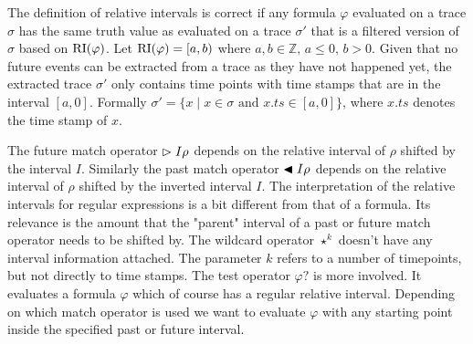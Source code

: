 The definition of relative intervals is correct if any formula $\varphi$ evaluated on a trace $\sigma$ has the same truth value as evaluated on a trace $\sigma'$ that is a filtered version of $\sigma$ based on $\operatorname{RI}(\varphi)$.
Let $\operatorname{RI}(\varphi) = [a,b)$ where $a,b \in \mathbb{Z}, \, a \leq 0, \, b > 0$.
Given that no future events can be extracted from a trace as they have not happened yet, the extracted trace $\sigma'$ only contains time points with time stamps that are in the interval $[a,0]$.
Formally $\sigma' = \{x \mid x \in \sigma \text{ and } x.ts \in [a,0]\}$, where $x.ts$ denotes the time stamp of $x$.

The future match operator $\vartriangleright{I} \rho$ depends on the relative interval of $\rho$ shifted by the interval $I$.
Similarly the past match operator $\blacktriangleleft{I} \rho$ depends on the relative interval of $\rho$ shifted by the inverted interval $I$.
The interpretation of the relative intervals for regular expressions is a bit different from that of a formula.
Its relevance is the amount that the "parent" interval of a past or future match operator needs to be shifted by.
The wildcard operator $\star^k$ doesn't have any interval information attached.
The parameter $k$ refers to a number of timepoints, but not directly to time stamps.
The test operator $\varphi ?$ is more involved.
It evaluates a formula $\varphi$ which of course has a regular relative interval.
Depending on which match operator is used we want to evaluate $\varphi$ with any starting point inside the specified past or future interval.
